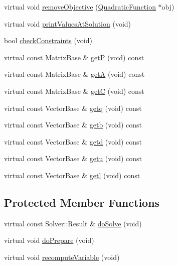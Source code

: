\begin{DoxyCompactItemize}
\item 
virtual void \hyperlink{classocra_1_1CmlQuadraticSolver_a83d20013d6a9ff7c5855ee0ff2391190}{remove\+Objective} (\hyperlink{classocra_1_1QuadraticFunction}{Quadratic\+Function} $\ast$obj)
\item 
virtual void \hyperlink{classocra_1_1CmlQuadraticSolver_aed7554d599282ef5e8a7567b73b822b8}{print\+Values\+At\+Solution} (void)
\item 
bool \hyperlink{classocra_1_1CmlQuadraticSolver_a8077e7d9f2017f0f176324bb04cb5cd1}{check\+Constraints} (void)
\item 
virtual const Matrix\+Base \& \hyperlink{classocra_1_1CmlQuadraticSolver_a2d02c9af54a4456eac7e56803ee037f3}{getP} (void) const
\item 
virtual const Matrix\+Base \& \hyperlink{classocra_1_1CmlQuadraticSolver_a6bbc784066ced7a347a32de698069d07}{getA} (void) const
\item 
virtual const Matrix\+Base \& \hyperlink{classocra_1_1CmlQuadraticSolver_a94c170188e1f3d00aaee5628e2501a64}{getC} (void) const
\item 
virtual const Vector\+Base \& \hyperlink{classocra_1_1CmlQuadraticSolver_ac97f9655bd9a6d8564539cf7ec79c269}{getq} (void) const
\item 
virtual const Vector\+Base \& \hyperlink{classocra_1_1CmlQuadraticSolver_a1af1421b10bd780438cef59ac0293749}{getb} (void) const
\item 
virtual const Vector\+Base \& \hyperlink{classocra_1_1CmlQuadraticSolver_a0d3fd75da9a338208f7a5f5e1417346b}{getd} (void) const
\item 
virtual const Vector\+Base \& \hyperlink{classocra_1_1CmlQuadraticSolver_af674cde45f84730e2447d0e34a6e6918}{getu} (void) const
\item 
virtual const Vector\+Base \& \hyperlink{classocra_1_1CmlQuadraticSolver_a963b8e8e4f099e89003be3c9cb77fa90}{getl} (void) const
\end{DoxyCompactItemize}
\subsection*{Protected Member Functions}
\begin{DoxyCompactItemize}
\item 
virtual const Solver\+::\+Result \& \hyperlink{classocra_1_1CmlQuadraticSolver_aac5943e307225837253c470a931640ec}{do\+Solve} (void)
\item 
virtual void \hyperlink{classocra_1_1CmlQuadraticSolver_a6139c2cd572e403badc0451bf0ea9d90}{do\+Prepare} (void)
\item 
virtual void \hyperlink{classocra_1_1CmlQuadraticSolver_a2c2240bd0bcee4f0cd57030ed08baabd}{recompute\+Variable} (void)
\end{DoxyCompactItemize}
